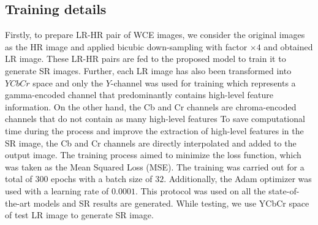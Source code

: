 \documentclass[conference]{IEEEtran}
\newcommand{\kr}[1]{\textcolor{red}{Kiran - #1}}
\begin{document}

\subsection{Training details}
Firstly, to prepare LR-HR pair of WCE images, we consider the original images as the HR image and applied bicubic down-sampling with factor $\times 4$ and obtained LR image. These LR-HR pairs are fed to the proposed model to train it to generate SR images. Further, each LR image has also been transformed into $YCbCr$ space and only the $Y$-channel was used for training which represents a gamma-encoded channel that predominantly contains high-level feature information. On the other hand, the Cb and Cr channels are chroma-encoded channels that do not contain as many high-level features %
To save computational time during the process and improve the extraction of high-level features in the SR image, the Cb and Cr channels are directly interpolated and added to the output image. The training process aimed to minimize the loss function, which was taken as the Mean Squared Loss (MSE). The training was carried out for a total of $300$ epochs with a batch size of $32$. Additionally, the Adam optimizer was used with a learning rate of $0.0001$. This protocol was used on all the state-of-the-art models and SR results are generated. While testing, we use YCbCr space of test LR image to generate SR image.
\end{document}
